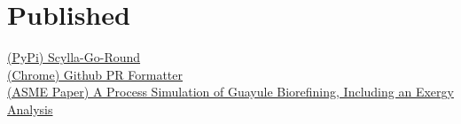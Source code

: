 \documentclass[]{deedy-resume}
\begin{document}
\begin{minipage}[t]{0.33\textwidth}
\sectionspace
\section{Published}
\textbullet{} \href{https://pypi.org/project/scylla-go-round/}{(PyPi) Scylla-Go-Round} \\
\textbullet{} \href{https://chromewebstore.google.com/detail/github-pr-title-formatter/pdjmmincfaficadbaemdifkbaioiihob}{(Chrome) Github PR Formatter} \\
\textbullet{}  \href{https://nuclearengineering.asmedigitalcollection.asme.org/ES/proceedings-abstract/ES2016/50220/V001T13A001/231202}{(ASME Paper) A Process Simulation of Guayule Biorefining, Including an Exergy Analysis}


%
%

\end{minipage} 
\hfill
\end{document}
